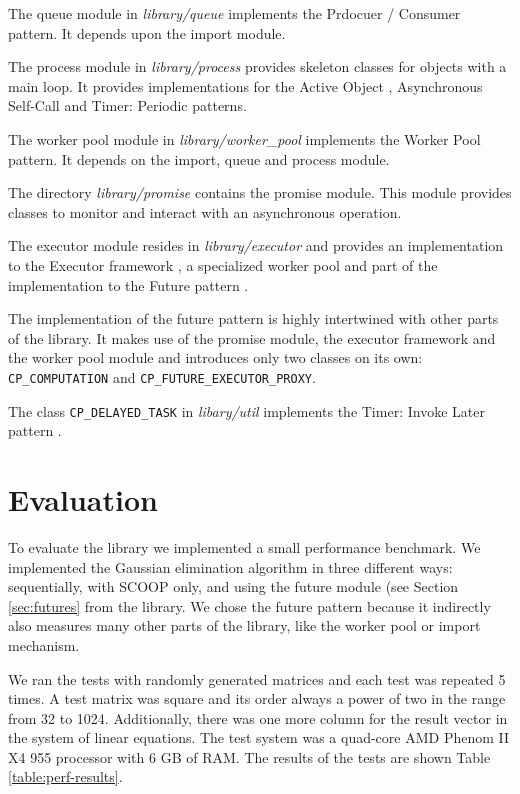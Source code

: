 \documentclass[a4paper,10pt]{article}
\newcommand{\dir}{\emph}
\begin{document}
The queue module in \dir{library/queue} implements the Prdocuer / Consumer  pattern.
It depends upon the import module.

The process module in \dir{library/process} provides skeleton classes for objects with a main loop.
It provides implementations for the Active Object , Asynchronous Self-Call  and Timer: Periodic  patterns.

The worker pool module in \dir{library/worker\_pool} implements the Worker Pool  pattern.
It depends on the import, queue and process module.

The directory \dir{library/promise} contains the promise module.
This module provides classes to monitor and interact with an asynchronous operation.

The executor module resides in \dir{library/executor} and provides an implementation to the Executor framework , 
a specialized worker pool and part of the implementation to the Future pattern .

The implementation of the future pattern is highly intertwined with other parts of the library.
It makes use of the promise module, the executor framework and the worker pool module and introduces only two classes on its own: \lstinline!CP_COMPUTATION! and \lstinline!CP_FUTURE_EXECUTOR_PROXY!.

The class \lstinline!CP_DELAYED_TASK! in \dir{libary/util} implements the Timer: Invoke Later pattern .



\section{Evaluation}
\label {sec:evaluation}

To evaluate the library we implemented a small performance benchmark.
We implemented the Gaussian elimination algorithm in three different ways: sequentially, with SCOOP only, and using the future module (see Section \ref{sec:futures} from the library.
We chose the future pattern because it indirectly also measures many other parts of the library, like the worker pool or import mechanism.

We ran the tests with randomly generated matrices and each test was repeated 5 times.
A test matrix was square and its order always a power of two in the range from 32 to 1024.
Additionally, there was one more column for the result vector in the system of linear equations.
The test system was a quad-core AMD Phenom II X4 955 processor with 6 GB of RAM.
The results of the tests are shown Table \ref{table:perf-results}.
\end{document}
